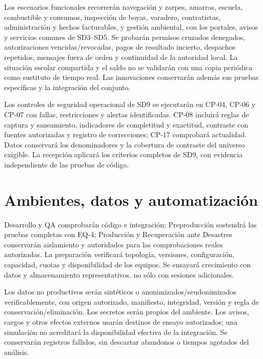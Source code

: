Los escenarios funcionales recorrerán navegación y zarpes, amarras, escuela, combustible y consumos, inspección de boyas, varadero, contratistas, administración y hechos facturables, y gestión ambiental, con los portales, avisos y servicios comunes de SD3--SD5. Se probarán permisos cruzados denegados, autorizaciones vencidas/revocadas, pagos de resultado incierto, despachos repetidos, mensajes fuera de orden y continuidad de la autoridad local. La situación escolar compartida y el saldo no se validarán con una copia periódica como sustituto de tiempo real. Las innovaciones conservarán además sus pruebas específicas y la integración del conjunto. \parencites[cap.~15, pp.~34--37]{sd9-c07}[sec.~5.2--5.4]{sd9-sd5}

Los controles de seguridad operacional de SD9 se ejecutarán en CP-04, CP-06 y CP-07 con fallas, restricciones y alertas identificadas. CP-08 incluirá reglas de captura y saneamiento, indicadores de completitud y exactitud, contraste con fuentes autorizadas y registro de correcciones; CP-17 comprobará actualidad. Datos conservará los denominadores y la cobertura de contraste del universo exigible. La recepción aplicará los criterios completos de SD9, con evidencia independiente de las pruebas de código. \parencites{sd9-25012}[sec.~9.1.4]{sd9-sd9}

\section{Ambientes, datos y automatización}
Desarrollo y QA comprobarán código e integración; Preproducción sostendrá las pruebas completas con EQ-4; Producción y Recuperación ante Desastres conservarán aislamiento y autoridades para las comprobaciones reales autorizadas. La preparación verificará topología, versiones, configuración, capacidad, cuotas y disponibilidad de los equipos. Se ensayará crecimiento con datos y almacenamiento representativos, no sólo con sesiones adicionales. \parencite[sec.~6.2]{sd9-sd6}

Los datos no productivos serán sintéticos o anonimizados/seudonimizados verificablemente, con origen autorizado, manifiesto, integridad, versión y regla de conservación/eliminación. Los secretos serán propios del ambiente. Los avisos, cargos y otros efectos externos usarán destinos de ensayo autorizados; una simulación no acreditará la disponibilidad efectiva de la integración. Se conservarán registros fallidos, sin descartar abandonos o tiempos agotados del análisis. \parencites[RT-11.25, p.~24]{sd9-bt}[sec.~9.2.3]{sd9-sd9}

